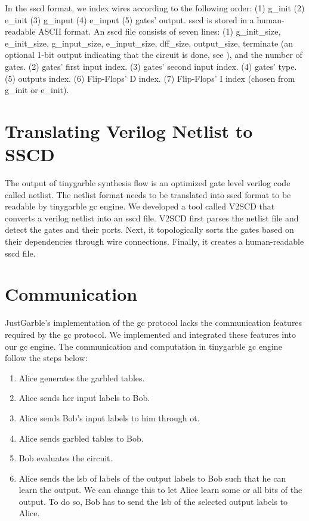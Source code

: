In the \acrshort{sscd} format, we index wires according to the following order: (1) g\_init (2) e\_init (3) g\_input (4) e\_input (5) gates' output.
\acrshort{sscd} is stored in a human-readable ASCII format.
An \acrshort{sscd} file consists of seven lines: (1) g\_init\_size, e\_init\_size, g\_input\_size, e\_input\_size, dff\_size, output\_size, terminate (an optional 1-bit output indicating that the circuit is done, see ), and the number of gates. (2) gates' first input index. (3) gates' second input index. (4) gates' type. (5) outputs index. (6) Flip-Flops' D index. (7) Flip-Flops' I index (chosen from g\_init or e\_init).

\section{Translating Verilog Netlist to SSCD}\label{sec:engine-v2sscd}
The output of \gls{tinygarble} synthesis flow is an optimized gate level \gls{verilog} code called \gls{netlist}.
The \gls{netlist} format needs to be translated into \acrshort{sscd} format to be readable by \gls{tinygarble} \acrshort{gc} engine.
We developed a tool called V2SCD that converts a \gls{verilog} \gls{netlist} into an \acrshort{sscd} file.
V2SCD first parses the \gls{netlist} file and detect the gates and their ports.
Next, it topologically sorts the gates based on their dependencies through wire connections.
Finally, it creates a human-readable \acrshort{sscd} file.

\section{Communication}\label{sec:engine-comm}
JustGarble's implementation of the \acrshort{gc} protocol lacks the communication features required by the \acrshort{gc} protocol.
We implemented and integrated these features into our \acrshort{gc} engine.
The communication and computation in \gls{tinygarble} \acrshort{gc} engine follow the steps below:
\begin{enumerate}
\item Alice generates the garbled tables.
\item Alice sends her input labels to Bob.
\item Alice sends Bob's input labels to him through \acrshort{ot}.
\item Alice sends garbled tables to Bob.
\item Bob evaluates the circuit.
\item Alice sends the \acrfull{lsb} of labels of the output labels to Bob such that he can learn the output.
  We can change this to let Alice learn some or all bits of the output.
  To do so, Bob has to send the \acrshort{lsb} of the selected output labels to Alice.
\end{enumerate}

